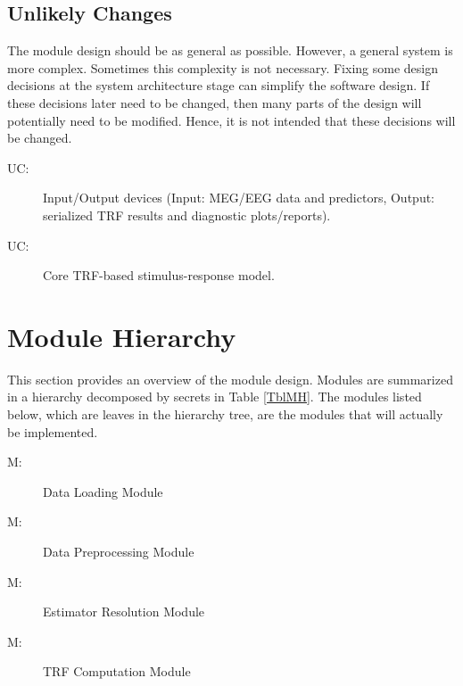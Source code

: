 \documentclass[12pt, titlepage]{article}
\newcounter{ucnum}
\newcommand{\uctheucnum}{UC\theucnum}
\newcounter{mnum}
\newcommand{\mthemnum}{M\themnum}
\begin{document}

\subsection{Unlikely Changes} \label{SecUchange}

The module design should be as general as possible. However, a general system is
more complex. Sometimes this complexity is not necessary. Fixing some design
decisions at the system architecture stage can simplify the software design. If
these decisions later need to be changed, then many parts of the design
will potentially need to be modified. Hence, it is not intended that these
decisions will be changed.

\begin{description}
\item[ \uctheucnum \label{ucIO}:] Input/Output devices
  (Input: MEG/EEG data and predictors, Output: serialized TRF results and
  diagnostic plots/reports).
\item[ \uctheucnum \label{ucIO}:] Core TRF-based stimulus-response model.

\end{description}

\section{Module Hierarchy} \label{SecMH}

This section provides an overview of the module design. Modules are summarized
in a hierarchy decomposed by secrets in Table \ref{TblMH}. The modules listed
below, which are leaves in the hierarchy tree, are the modules that will
actually be implemented.

\begin{description}
\item [ \mthemnum \label{mHH}:] Data Loading Module
\item  [ \mthemnum \label{mInput}:]  Data Preprocessing Module
\item [ \mthemnum \label{mEstimator}:] Estimator Resolution Module
\item [ \mthemnum \label{mTRF}:] TRF Computation Module
\end{description}
\end{document}
